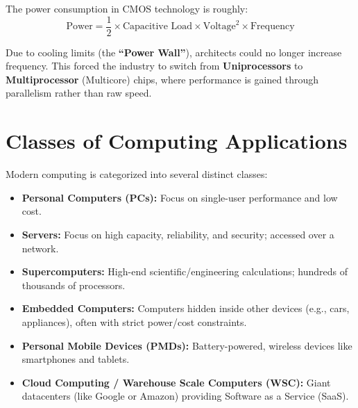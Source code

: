 \begin{proposition}
The power consumption in CMOS technology is roughly:
\begin{equation}
\text{Power} = \frac{1}{2} \times \text{Capacitive Load} \times \text{Voltage}^2 \times \text{Frequency}
\end{equation}
\end{proposition}

\begin{remark}
Due to cooling limits (the \textbf{``Power Wall''}), architects could no longer increase frequency. This forced the industry to switch from \textbf{Uniprocessors} to \textbf{Multiprocessor} (Multicore) chips, where performance is gained through parallelism rather than raw speed.
\end{remark}

\section{Classes of Computing Applications}

Modern computing is categorized into several distinct classes:

\begin{itemize}
    \item \textbf{Personal Computers (PCs):} Focus on single-user performance and low cost.
    \item \textbf{Servers:} Focus on high capacity, reliability, and security; accessed over a network.
    \item \textbf{Supercomputers:} High-end scientific/engineering calculations; hundreds of thousands of processors.
    \item \textbf{Embedded Computers:} Computers hidden inside other devices (e.g., cars, appliances), often with strict power/cost constraints.
    \item \textbf{Personal Mobile Devices (PMDs):} Battery-powered, wireless devices like smartphones and tablets.
    \item \textbf{Cloud Computing / Warehouse Scale Computers (WSC):} Giant datacenters (like Google or Amazon) providing Software as a Service (SaaS).
\end{itemize}
